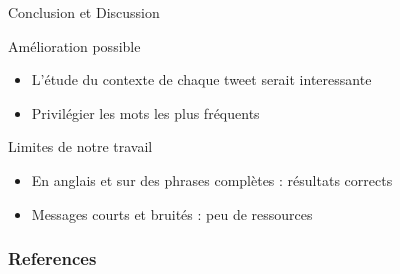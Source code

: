 \documentclass{beamer}
\begin{document}
\begin{frame}{Conclusion et Discussion}
\begin{block}{Amélioration possible}
\begin{itemize}
  \item L'étude du contexte de chaque tweet serait interessante
  \item Privilégier les mots les plus fréquents
\end{itemize}
\end{block}

\begin{block}{Limites de notre travail}
\begin{itemize}
  \item En anglais et sur des phrases complètes : résultats corrects
  \item Messages courts et bruités : peu de ressources
\end{itemize}
\end{block}
\vspace{0.5cm}
\end{frame}






\begin{frame}[allowframebreaks] %

\frametitle{References}

\scriptsize{}


\end{frame}
\end{document}
